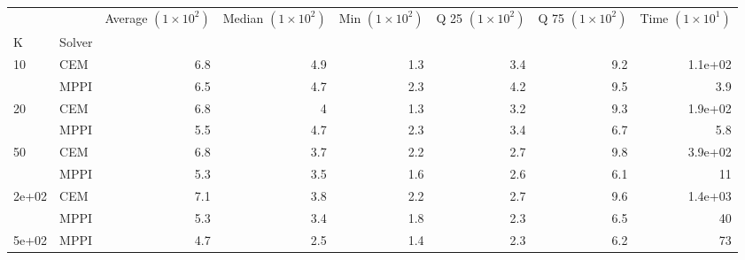 \documentclass[]{standalone}
\begin{document}
\begin{tabular}{llrrrrrr}
\toprule
      &      &  Average $(1 \times 10^2) $ &  Median $(1 \times 10^2) $ &  Min $(1 \times 10^2) $ &  Q 25 $(1 \times 10^2) $ &  Q 75 $(1 \times 10^2) $ &  Time $(1 \times 10^1) $ \\
K & Solver &                             &                            &                         &                          &                          &                          \\
\midrule
10    & CEM &                         6.8 &                        4.9 &                     1.3 &                      3.4 &                      9.2 &                  1.1e+02 \\
      & MPPI &                         6.5 &                        4.7 &                     2.3 &                      4.2 &                      9.5 &                      3.9 \\
20    & CEM &                         6.8 &                          4 &                     1.3 &                      3.2 &                      9.3 &                  1.9e+02 \\
      & MPPI &                         5.5 &                        4.7 &                     2.3 &                      3.4 &                      6.7 &                      5.8 \\
50    & CEM &                         6.8 &                        3.7 &                     2.2 &                      2.7 &                      9.8 &                  3.9e+02 \\
      & MPPI &                         5.3 &                        3.5 &                     1.6 &                      2.6 &                      6.1 &                       11 \\
2e+02 & CEM &                         7.1 &                        3.8 &                     2.2 &                      2.7 &                      9.6 &                  1.4e+03 \\
      & MPPI &                         5.3 &                        3.4 &                     1.8 &                      2.3 &                      6.5 &                       40 \\
5e+02 & MPPI &                         4.7 &                        2.5 &                     1.4 &                      2.3 &                      6.2 &                       73 \\
\bottomrule
\end{tabular}
\end{document}
